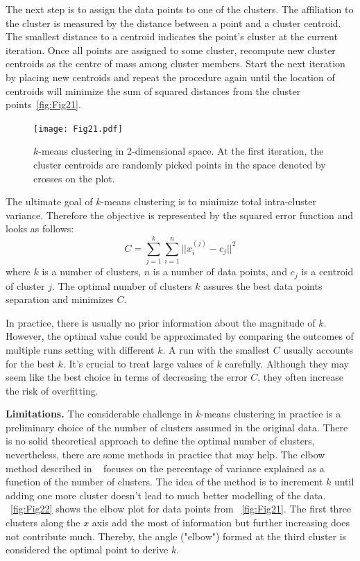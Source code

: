 The next step is to assign the data points to one of the clusters. The affiliation to the cluster is measured by the distance between a point and a cluster centroid. The smallest distance to a centroid indicates the point's cluster at the current iteration. Once all points are assigned to some cluster, recompute new cluster centroids as the centre of mass among cluster members. Start the next iteration by placing new centroids and repeat the procedure again until the location of centroids will minimize the sum of squared distances from the cluster points~\autoref{fig:Fig21}.
\begin{figure}[H]
    \centering
    \texttt{[image: Fig21.pdf]}
    \caption{$k$-means clustering in 2-dimensional space. At the first iteration, the cluster centroids are randomly picked points in the space denoted by crosses on the plot.}
    \label{fig:Fig21}
\end{figure}

The ultimate goal of $k$-means clustering is to minimize total intra-cluster variance. Therefore the objective is represented by the squared error function and looks as follows:
\begin{equation}
  C = \sum_{j=1}^{k} \sum_{i=1}^{n}||x_i^{(j)}-c_j||^2
  \label{eq:equat15}
\end{equation}
where $k$ is a number of clusters, $n$ is a number of data points, and $c_j$ is a centroid of cluster $j$. The optimal number of clusters $k$ assures the best data points separation and minimizes $C$.

In practice, there is usually no prior information about the magnitude of $k$. However, the optimal value could be approximated by comparing the outcomes of multiple runs setting with different $k$. A run with the smallest $C$ usually accounts for the best $k$. It's crucial to treat large values of $k$ carefully. Although they may seem like the best choice in terms of decreasing the error $C$, they often increase the risk of overfitting.

\textbf{Limitations. }
The considerable challenge in $k$-means clustering in practice is a preliminary choice of the number of clusters assumed in the original data. There is no solid theoretical approach to define the optimal number of clusters, nevertheless, there are some methods in practice that may help. The elbow method described in ~\cite{ElbowMethod2014} focuses on  the percentage of variance explained as a function of the number of clusters. The idea of the method is to increment $k$ until adding one more cluster doesn't lead to much better modelling of the data. ~\autoref{fig:Fig22} shows the elbow plot for data points from ~\autoref{fig:Fig21}. The first three clusters along the $x$ axis add the most of information but further increasing does not contribute much. Thereby, the angle ("elbow") formed at the third cluster is considered the optimal point to derive $k$. 

